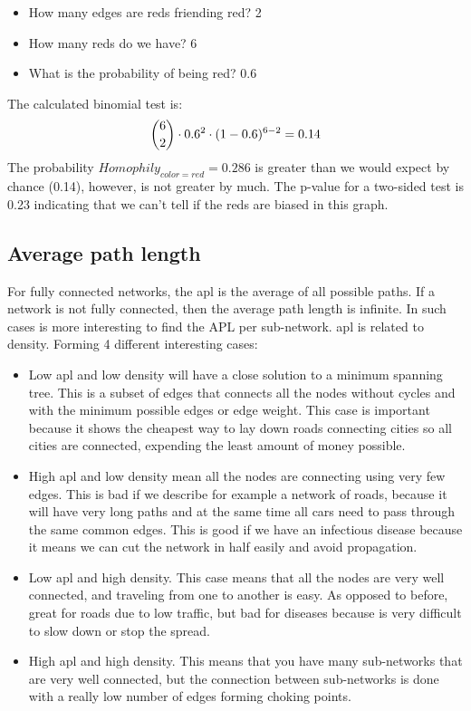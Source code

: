     \begin{itemize}
        \item How many edges are reds friending red? 2
        \item How many reds do we have? 6
        \item What is the probability of being red? 0.6 
    \end{itemize}

The calculated binomial test is:
    \begin{equation*}
         \dbinom{6}{2} \cdot 0.6^2 \cdot (1-0.6)^{6-2} = 0.14
    \end{equation*}
The probability $Homophily_{color = red} = 0.286$ is greater than we would expect by chance (0.14), however, is not greater by much. The p-value for a two-sided test is 0.23 indicating that we can't tell if the reds are biased in this graph.

\subsection{Average path length}

For fully connected networks, the \gls{apl} is the average of all possible paths. If a network is not fully connected, then the average path length is infinite. In such cases is more interesting to find the APL per sub-network. \gls{apl} is related to density. Forming 4 different interesting cases:

\begin{itemize}
    \item  Low \gls{apl} and low density will have a close solution to a minimum spanning tree. This is a subset of edges that connects all the nodes without cycles and with the minimum possible edges or edge weight. This case is important because it shows the cheapest way to lay down roads connecting cities so all cities are connected, expending the least amount of money possible.
    \item  High \gls{apl} and low density mean all the nodes are connecting using very few edges. This is bad if we describe for example a network of roads, because it will have very long paths and at the same time all cars need to pass through the same common edges. This is good if we have an infectious disease because it means we can cut the network in half easily and avoid propagation.
    \item  Low \gls{apl} and high density. This case means that all the nodes are very well connected, and traveling from one to another is easy. As opposed to before, great for roads due to low traffic, but bad for diseases because is very difficult to slow down or stop the spread.
    \item  High \gls{apl} and high density. This means that you have many sub-networks that are very well connected, but the connection between sub-networks is done with a really low number of edges forming choking points.
\end{itemize}

